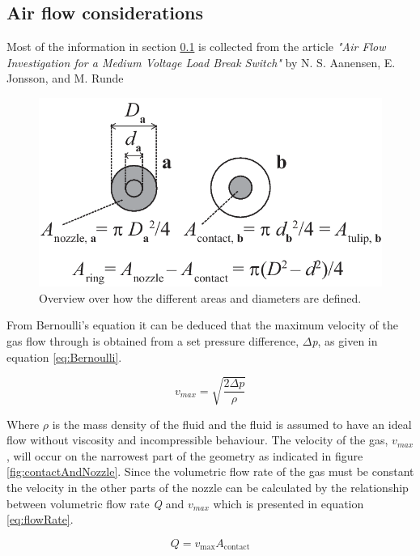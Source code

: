 \documentclass[10pt,a4paper,twoside]{article}
\begin{document}
\subsection{Air flow considerations} \label{sec:AirFlow}
 Most of the information in section \ref{sec:AirFlow} is collected from the article \textit{"Air Flow Investigation for a Medium Voltage Load Break Switch"} by N. S. Aanensen, E. Jonsson, and M. Runde \newline

\begin{figure} [h]
\centering
\includegraphics[scale=0.3]{Bilder/Theory/kontaktoversiktAnders.png}
\caption{Overview over how the different areas and diameters are defined.} \label{fig:AreacontactAndNozzle}
\end{figure}

From Bernoulli's equation it can be deduced that the maximum velocity of the gas flow through is obtained from a set pressure difference, $\Delta$\textit{p}, as given in equation \eqref{eq:Bernoulli}.

\begin{equation} \label{eq:Bernoulli}
v_{max}=\sqrt{ \frac{2 \Delta p}{\rho}}
\end{equation}

Where $\rho$ is the mass density of the fluid and the fluid is assumed to have an ideal flow without viscosity and incompressible behaviour. The velocity of the gas, $v_{max}$, will occur on the narrowest part of the geometry as indicated in figure \ref{fig:contactAndNozzle}. Since the volumetric flow rate of the gas must be constant the velocity in the other parts of the nozzle can be calculated by the relationship between volumetric flow rate \textit{Q} and $v_{max}$ which is presented in equation \eqref{eq:flowRate}.

\begin{equation} \label{eq:flowRate}
Q=v_{\mathrm{max}} A_\mathrm{{contact}}
\end{equation} 
\end{document}
